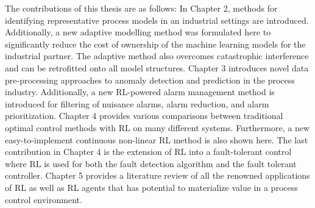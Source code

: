 The contributions of this thesis are as follows: In Chapter 2, methods for identifying representative process models in an industrial settings are introduced. Additionally, a new adaptive modelling method was formulated here to significantly reduce the cost of ownership of the machine learning models for the industrial partner. The adaptive method also overcomes catastrophic interference and can be retrofitted onto all model structures. Chapter 3 introduces novel data pre-processing approaches to anomaly detection and prediction in the process industry.  Additionally, a new RL-powered alarm management method is introduced for filtering of nuisance alarms, alarm reduction, and alarm prioritization.  Chapter 4 provides various comparisons between traditional optimal control methods with RL on many different systems. Furthermore, a new easy-to-implement continuous non-linear RL method is also shown here.  The last contribution in Chapter 4 is the extension of RL into a fault-tolerant control where RL is used for both the fault detection algorithm and the fault tolerant controller. Chapter 5 provides a literature review of all the renowned applications of RL as well as RL agents that has potential to materialize value in a process control environment.














